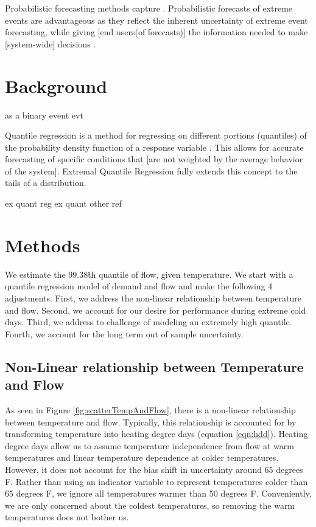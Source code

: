 \documentclass{article}
\begin{document}
Probabilistic forecasting methods capture . Probabilistic forecasts of extreme events are advantageous as they reflect the inherent uncertainty of extreme event forecasting, while giving [end users(of forecasts)] the information needed to make [system-wide] decisions \cite{murphy1991probabilities}.


\section{Background}
as a binary event\cite{toth2003probability}
evt\cite{kotz2000extreme}


Quantile regression is a method for regressing on different portions (quantiles) of the probability density function of a response variable \cite{koenker1978regression}. This allows for accurate forecasting of specific conditions that [are not weighted by the average behavior of the system]. Extremal Quantile Regression fully extends this concept to the tails of a distribution. 

ex quant reg \cite{chernozhukov2005extremal}
ex quant other ref \cite{wang2012estimation}

\section{Methods}

We estimate the 99.38\^{th} quantile of flow, given temperature. We start with a quantile regression model of demand and flow and make the following 4 adjustments. First, we address the non-linear relationship between temperature and flow. Second, we account for our desire for performance during extreme cold days. Third, we address to challenge of modeling an extremely high quantile. Fourth, we account for the long term out of sample uncertainty.

\subsection{Non-Linear relationship between Temperature and Flow}

As seen in Figure \ref{fig:scatterTempAndFlow}, there is a non-linear relationship between temperature and flow. Typically, this relationship is accounted for by transforming temperature into heating degree days (equation \ref{eqn:hdd}). Heating degree days allow us to assume temperature independence from flow at warm temperatures and linear temperature dependence at colder temperatures. However, it does not account for the bias shift in uncertainty around 65 degrees F. Rather than using an indicator variable to represent temperatures colder than 65 degrees F, we ignore all temperatures warmer than 50 degrees F. Conveniently, we are only concerned about the coldest temperatures, so removing the warm temperatures does not bother us.
\end{document}
